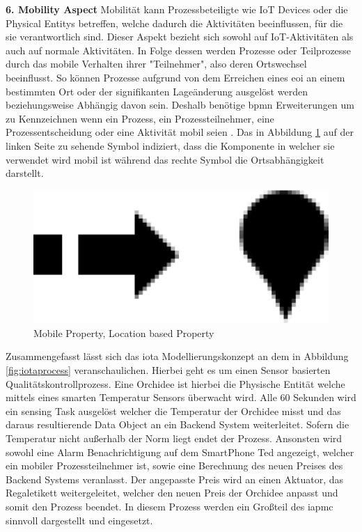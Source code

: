 \documentclass[a4paper, 12pt, twoside, headsepline=true]{scrartcl} %
\begin{document}
\textbf{6. Mobility Aspect}
\newline
Mobilität kann Prozessbeteiligte wie IoT Devices oder die Physical Entitys betreffen, welche dadurch die Aktivitäten beeinflussen, für die sie verantwortlich sind. Dieser Aspekt bezieht sich sowohl auf IoT-Aktivitäten als auch auf normale Aktivitäten. In Folge dessen werden Prozesse oder Teilprozesse durch das mobile Verhalten ihrer "Teilnehmer", also deren Ortswechsel beeinflusst. So können Prozesse aufgrund von dem Erreichen eines \ac{eoi} an einem bestimmten Ort oder der signifikanten Lageänderung ausgelöst werden beziehungsweise Abhängig davon sein. Deshalb benötige \ac{bpmn} Erweiterungen um zu Kennzeichnen wenn ein Prozess, ein Prozessteilnehmer, eine Prozessentscheidung oder eine Aktivität mobil seien \cite[S.68-70]{conceptsiotawarepm}. Das in Abbildung \ref{fig:mobile} auf der linken Seite zu sehende Symbol indiziert, dass die Komponente in welcher sie verwendet wird mobil ist während das rechte Symbol die Ortsabhängigkeit darstellt.

\begin{figure}[H]
	\includegraphics[height=1 cm,keepaspectratio,center]{figures/Mobile}
	\caption{Mobile Property, Location based Property\cite[S.71]{conceptsiotawarepm}}
	\label{fig:mobile}
\end{figure} 

Zusammengefasst lässt sich das \ac{iota} Modellierungskonzept an dem in Abbildung \ref{fig:iotaprocess} veranschaulichen. Hierbei geht es um einen Sensor basierten Qualitätskontrollprozess. Eine Orchidee ist hierbei die Physische Entität welche mittels eines smarten Temperatur Sensors überwacht wird. Alle 60 Sekunden wird ein sensing Task ausgelöst welcher die Temperatur der Orchidee misst und das daraus resultierende Data Object an ein Backend System weiterleitet. Sofern die Temperatur nicht außerhalb der Norm liegt endet der Prozess. Ansonsten wird sowohl eine Alarm Benachrichtigung auf dem SmartPhone Ted angezeigt, welcher ein mobiler Prozessteilnehmer ist, sowie eine Berechnung des neuen Preises des Backend Systems veranlasst. Der angepasste Preis wird an einen Aktuator, das Regaletikett weitergeleitet, welcher den neuen Preis der Orchidee anpasst und somit den Prozess beendet. In diesem Prozess werden ein Großteil des \ac{iapmc} sinnvoll dargestellt und eingesetzt.
\end{document}
